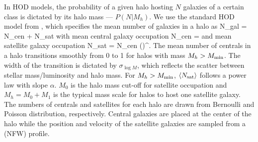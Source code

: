 In HOD models, the probability of a given halo hosting $N$ galaxies of a
certain class is dictated by its halo mass --- $P(N|M_h)$. We use the standard
HOD model from \cite{zheng2007}, which specifies the mean number of galaxies in
a halo as
\beq
\langle N_{\rm gal} \rangle = \langle N_{\rm cen} \rangle + \langle N_{\rm sat} \rangle
\eeq
with mean central galaxy occupation
\beq \label{eq:Ncen}
\langle N_{\rm cen} \rangle  = 
\eeq
and mean satellite galaxy occupation
\beq \label{eq:Nsat}
\langle N_{\rm sat} \rangle = \langle N_{\rm cen} \rangle \bigg(\bigg)^\alpha.
\eeq
The mean number of centrals in a halo transitions smoothly from 0 to 1 for halos 
with mass $M_h > M_{\rm min}$. The width of the transition is dictated by 
$\sigma_{\log M}$, which reflects the scatter between stellar mass/luminosity and 
halo mass. For $M_h > M_{\rm min}$, $\langle N_{\rm sat} \rangle$ follows a power 
law with slope $\alpha$. $M_0$ 
is the halo mass cut-off for satellite occupation and $M_h = M_0 + M_1$ is 
the typical mass scale for halos to host one satellite galaxy. The numbers 
of centrals and satellites for each halo are drawn from Bernoulli and Poisson 
distribution, respectively. Central galaxies are placed at the center of the
halo while the position and velocity of the satellite galaxies are sampled from a 
\cite{navarro1997} (NFW) profile. 

